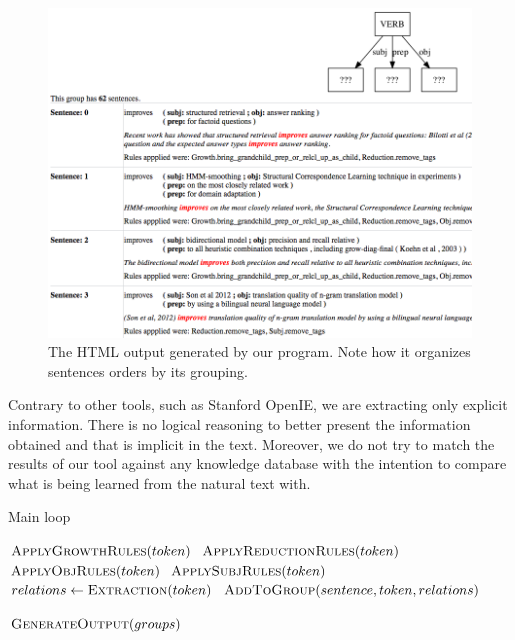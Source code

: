 \documentclass[11pt,a4paper,openright]{memoir}
\begin{document}
\begin{figure}[!htbp]
  \centering
    \includegraphics[width=1.0\textwidth]{./images/html_output}
  \caption[The HTML output generated by our program.]{The HTML output generated by our program. Note how it organizes sentences orders by its grouping.}
  \label{fig:html_output}
\end{figure}

Contrary to other tools, such as Stanford OpenIE, we are extracting only explicit information. There is no logical reasoning to better present the information obtained and that is implicit in the text. Moreover, we do not try to match the results of our tool against any knowledge database with the intention to compare what is being learned from the natural text with.

\begin{algorithm}[t]
  \caption{Main loop}\label{main}
  \begin{algorithmic}[1]
	
       \State $\Call{ApplyGrowthRules}{token}$
       \State $\Call{ApplyReductionRules}{token}$
       \State $\Call{ApplyObjRules}{token}$
       \State $\Call{ApplySubjRules}{token}$
       \State $relations\gets \Call{Extraction}{token}$
       \State $\Call{AddToGroup}{sentence, token, relations}$
    \EndFor
    
    \State $\Call{GenerateOutput}{groups}$
    
    \EndProcedure
  \end{algorithmic}
\end{algorithm}
\end{document}
